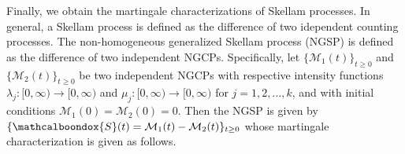 \documentclass[11pt,oneside,reqno]{amsart}
\theoremstyle{definition}
\newtheorem{remark}{\bf Remark}[section]
\theoremstyle{remarkstyle}
\begin{document}
Finally, we obtain the martingale characterizations of Skellam processes. In general, a Skellam process is defined as the difference of two idependent counting processes. The non-homogeneous generalized Skellam process (NGSP) is defined as the difference of two independent NGCPs. Specifically, let $\{\mathcal{M}_{1}(t)\}_{t \ge 0}$ and $\{\mathcal{M}_{2}(t)\}_{t \ge 0}$ be two independent NGCPs with respective intensity functions $\lambda_{j} : [0,\infty) \rightarrow [0,\infty)$ and $\mu_{j} : [0,\infty) \rightarrow [0,\infty)$ for $j = 1, 2, \ldots, k$, and with initial conditions $\mathcal{M}_{1}(0) = \mathcal{M}_{2}(0) = 0$. Then the NGSP is given by $\{\mathcalboondox{S}(t) = \mathcal{M}_{1}(t) - \mathcal{M}_{2}(t)\}_{t\ge 0}$ whose martingale characterization is given as follows.
\end{document}
